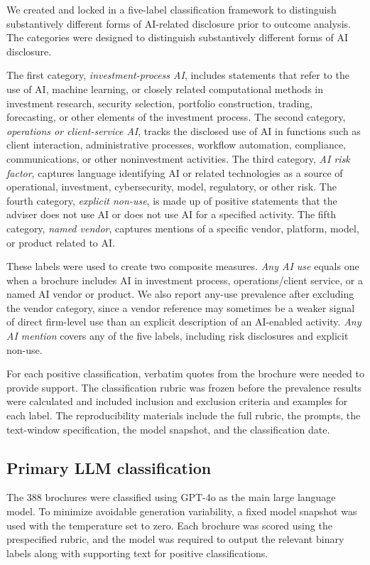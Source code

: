 \documentclass[utf8]{FrontiersinHarvard}
\begin{document}
We created and locked in a five-label classification framework to distinguish substantively different forms of AI-related disclosure prior to outcome analysis. The categories were designed to distinguish substantively different forms of AI disclosure.

The first category, \emph{investment-process AI}, includes statements that refer to the use of AI, machine learning, or closely related computational methods in investment research, security selection, portfolio construction, trading, forecasting, or other elements of the investment process. The second category, \emph{operations or client-service AI}, tracks the disclosed use of AI in functions such as client interaction, administrative processes, workflow automation, compliance, communications, or other noninvestment activities. The third category, \emph{AI risk factor}, captures language identifying AI or related technologies as a source of operational, investment, cybersecurity, model, regulatory, or other risk. The fourth category, \emph{explicit non-use}, is made up of positive statements that the adviser does not use AI or does not use AI for a specified activity. The fifth category, \emph{named vendor}, captures mentions of a specific vendor, platform, model, or product related to AI.

These labels were used to create two composite measures. \emph{Any AI use} equals one when a brochure includes AI in investment process, operations/client service, or a named AI vendor or product. We also report any-use prevalence after excluding the vendor category, since a vendor reference may sometimes be a weaker signal of direct firm-level use than an explicit description of an AI-enabled activity. \emph{Any AI mention} covers any of the five labels, including risk disclosures and explicit non-use.

For each positive classification, verbatim quotes from the brochure were needed to provide support. The classification rubric was frozen before the prevalence results were calculated and included inclusion and exclusion criteria and examples for each label. The reproducibility materials include the full rubric, the prompts, the text-window specification, the model snapshot, and the classification date.

\subsection{Primary LLM classification}

The 388 brochures were classified using GPT-4o as the main large language model. To minimize avoidable generation variability, a fixed model snapshot was used with the temperature set to zero. Each brochure was scored using the prespecified rubric, and the model was required to output the relevant binary labels along with supporting text for positive classifications.
\end{document}
